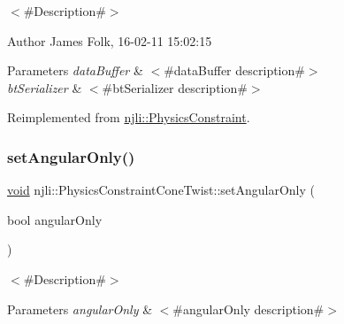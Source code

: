 $<$\#\+Description\#$>$ 

\begin{DoxyAuthor}{Author}
James Folk, 16-\/02-\/11 15\+:02\+:15
\end{DoxyAuthor}

\begin{DoxyParams}{Parameters}
{\em data\+Buffer} & $<$\#data\+Buffer description\#$>$ \\
\hline
{\em bt\+Serializer} & $<$\#bt\+Serializer description\#$>$ \\
\hline
\end{DoxyParams}


Reimplemented from \mbox{\hyperlink{classnjli_1_1_physics_constraint_ae294d089963246a8e65b41913730efb1}{njli\+::\+Physics\+Constraint}}.

\mbox{\label{classnjli_1_1_physics_constraint_cone_twist_a6c8c071ebac0a8b00d66a17044c9d62a}} 
\subsubsection{\texorpdfstring{set\+Angular\+Only()}{setAngularOnly()}}
{\footnotesize\ttfamily \mbox{\hyperlink{_thread_8h_af1e856da2e658414cb2456cb6f7ebc66}{void}} njli\+::\+Physics\+Constraint\+Cone\+Twist\+::set\+Angular\+Only (\begin{DoxyParamCaption}\item[{bool}]{angular\+Only }\end{DoxyParamCaption})}

$<$\#\+Description\#$>$


\begin{DoxyParams}{Parameters}
{\em angular\+Only} & $<$\#angular\+Only description\#$>$ \\
\hline
\end{DoxyParams}
\mbox{\label{classnjli_1_1_physics_constraint_cone_twist_a9552eedd807cd2833d584d0ccbf74f91}} 
